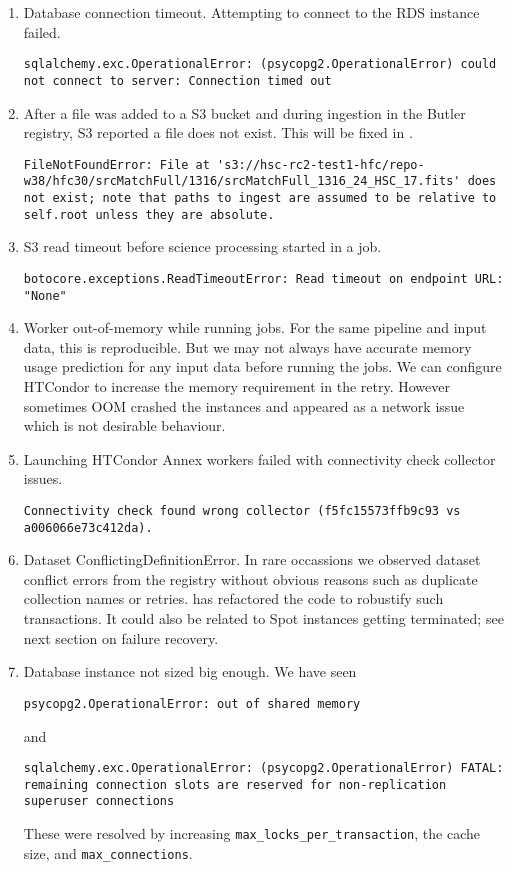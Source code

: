 \begin{enumerate}
\item Database connection timeout.
Attempting to connect to the RDS instance failed.
\begin{lstlisting}[style=basherror]
sqlalchemy.exc.OperationalError: (psycopg2.OperationalError) could not connect to server: Connection timed out
\end{lstlisting}
\item
After a file was added to a S3 bucket and during ingestion in the Butler registry, S3 reported a file does not exist.
This will be fixed in .
\begin{lstlisting}[style=basherror]
FileNotFoundError: File at 's3://hsc-rc2-test1-hfc/repo-w38/hfc30/srcMatchFull/1316/srcMatchFull_1316_24_HSC_17.fits' does not exist; note that paths to ingest are assumed to be relative to self.root unless they are absolute.
\end{lstlisting}
\item S3 read timeout before science processing started in a job.
\begin{lstlisting}[style=basherror]
botocore.exceptions.ReadTimeoutError: Read timeout on endpoint URL: "None"
\end{lstlisting}
\item Worker out-of-memory while running jobs.
For the same pipeline and input data, this is reproducible.
But we may not always have accurate memory usage prediction for any input data before running the jobs.
We can configure HTCondor to increase the memory requirement in the retry.
However sometimes OOM crashed the instances and appeared as a network issue which is not  desirable behaviour.
\item Launching HTCondor Annex workers failed with connectivity check collector issues.
\begin{lstlisting}[style=basherror]
Connectivity check found wrong collector (f5fc15573ffb9c93 vs a006066e73c412da).
\end{lstlisting}
\item Dataset ConflictingDefinitionError.
In rare occassions we observed dataset conflict errors from the registry without obvious reasons such as duplicate collection names or retries.
 has refactored the code to robustify such transactions.
It could also be related to Spot instances getting terminated;
see next section on failure recovery.
\item Database instance not sized big enough.
We have seen
\begin{lstlisting}[style=basherror]
psycopg2.OperationalError: out of shared memory
\end{lstlisting}
and
\begin{lstlisting}[style=basherror]
sqlalchemy.exc.OperationalError: (psycopg2.OperationalError) FATAL:  remaining connection slots are reserved for non-replication superuser connections
\end{lstlisting}
These were resolved by increasing \texttt{max\_locks\_per\_transaction}, the cache size, and \texttt{max\_connections}.
\end{enumerate}


